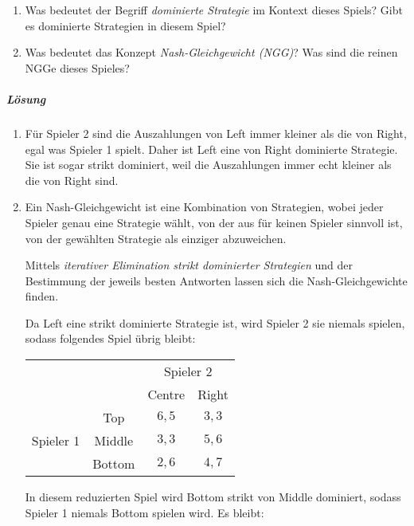 \begin{enumerate}
  \item Was bedeutet der Begriff \textit{dominierte Strategie} im Kontext dieses Spiels?
    Gibt es dominierte Strategien in diesem Spiel?

  \item Was bedeutet das Konzept \textit{Nash-Gleichgewicht (NGG)}?
    Was sind die reinen NGGe dieses Spieles?
\end{enumerate}

\subparagraph{Lösung}%

\begin{enumerate}
  \item Für Spieler 2 sind die Auszahlungen von Left immer kleiner als die von Right, egal
    was Spieler 1 spielt.
    Daher ist Left eine von Right dominierte Strategie.
    Sie ist sogar strikt dominiert, weil die Auszahlungen immer echt kleiner als die von
    Right sind.

  \item Ein Nash-Gleichgewicht ist eine Kombination von Strategien, wobei jeder Spieler
    genau eine Strategie wählt, von der aus für keinen Spieler sinnvoll ist, von der
    gewählten Strategie als einziger abzuweichen.

    Mittels \textit{iterativer Elimination strikt dominierter Strategien} und der
    Bestimmung der jeweils besten Antworten lassen sich die Nash-Gleichgewichte finden.

    Da Left eine strikt dominierte Strategie ist, wird Spieler 2 sie niemals spielen,
    sodass folgendes Spiel übrig bleibt:

    \begin{center}
      \begin{tabular}{cccc}
        & & \multicolumn{2}{c}{Spieler 2}\\
        & & Centre & Right\\
        \cmidrule{3-4}
        \multirow{3}{*}{Spieler 1}
        & Top & $6,5$ & $3,3$\\
        \cmidrule{3-4}
        & Middle & $3,3$ & $5,6$\\
        \cmidrule{3-4}
        & Bottom & $2,6$ & $4,7$\\
        \cmidrule{3-4}
      \end{tabular}
    \end{center}

    In diesem reduzierten Spiel wird Bottom strikt von Middle dominiert, sodass Spieler 1
    niemals Bottom spielen wird. Es bleibt:


\end{enumerate}
